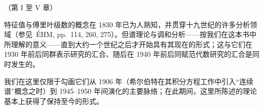 
（第 I 至 V 章）

特征值与傅里叶级数的概念在 1830 年已为人熟知，并贯穿十九世纪的许多分析领域（参见~ÉHM, pp.~114, 260, 275）。但谱理论与调和分析——按我们在这本书中所理解的意义——直到大约一个世纪之后才开始具有其现在的形式；这与它们在 1930 年前后同群表示研究的汇合、随后在 1940 年前后同赋范代数研究的汇合是同时发生的。

我们在这里仅限于勾画它们从 1906 年（希尔伯特在其积分方程工作中引入“连续谱”概念之时）到 1945–1950 年间演化的主要脉络；在此期间，这里所陈述的理论基本上获得了保持至今的形式。

